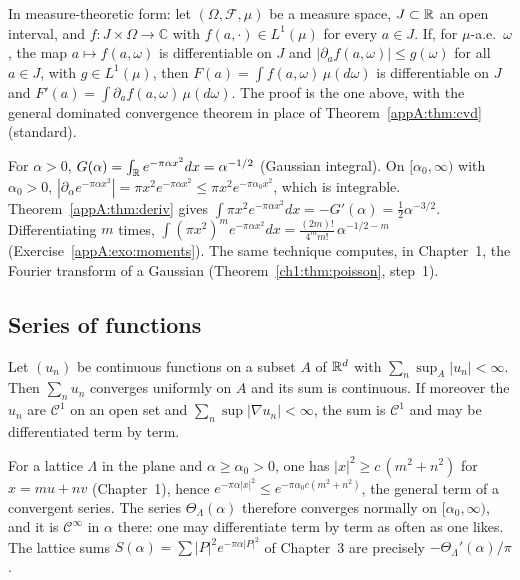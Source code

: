 \begin{uniremark}\tierL{} In measure-theoretic form: let $(\Omega,\mathcal F,\mu)$ be a measure space, $J\subset\mathbb{R}$ an
open interval, and $f:J\times\Omega\to\mathbb C$ with $f(a,\cdot)\in L^1(\mu)$ for every $a\in J$. If, for $\mu$-a.e.\
$\omega$, the map $a\mapsto f(a,\omega)$ is differentiable on $J$ and $|\partial_af(a,\omega)|\le g(\omega)$ for all
$a\in J$, with $g\in L^1(\mu)$, then $F(a)=\int f(a,\omega)\,\mu(d\omega)$ is differentiable on
$J$ and $F'(a)=\int\partial_af(a,\omega)\,\mu(d\omega)$. The proof is the one above, with the general dominated
convergence theorem in place of Theorem~\ref{appA:thm:cvd} (standard).
\end{uniremark}

\begin{example}\label{appA:ex:moments}
For $\alpha>0$, $G(\alpha)=\int_{\mathbb{R}} e^{-\pi\alpha x^2}dx=\alpha^{-1/2}$ (Gaussian integral). On $[\alpha_0,\infty)$ with
$\alpha_0>0$, $|\partial_\alpha e^{-\pi\alpha x^2}|=\pi x^2e^{-\pi\alpha x^2}\le\pi x^2e^{-\pi\alpha_0x^2}$, which is
integrable. Theorem~\ref{appA:thm:deriv} gives $\int\pi x^2e^{-\pi\alpha x^2}dx=-G'(\alpha)=\tfrac12\alpha^{-3/2}$.
Differentiating $m$ times, $\int(\pi x^2)^me^{-\pi\alpha x^2}dx=\frac{(2m)!}{4^mm!}\,\alpha^{-1/2-m}$
(Exercise~\ref{appA:exo:moments}). The same technique computes, in Chapter~1, the Fourier transform of a Gaussian
(Theorem~\ref{ch1:thm:poisson}, step~1).
\end{example}

\subsection{Series of functions}

\begin{proposition}\label{appA:prop:normale}
Let $(u_n)$ be continuous functions on a subset $A$ of $\mathbb{R}^d$ with $\sum_n\sup_A|u_n|<\infty$. Then
$\sum_nu_n$ converges uniformly on $A$ and its sum is continuous. If moreover the $u_n$ are $\mathcal C^1$ on an
open set and $\sum_n\sup|\nabla u_n|<\infty$, the sum is $\mathcal C^1$ and may be differentiated term by term.
\end{proposition}

\begin{example}
For a lattice $\Lambda$ in the plane and $\alpha\ge\alpha_0>0$, one has $|x|^2\ge c\,(m^2+n^2)$ for $x=mu+nv$
(Chapter~1), hence $e^{-\pi\alpha|x|^2}\le e^{-\pi\alpha_0c(m^2+n^2)}$, the general term of a convergent series. The
series $\Theta_\Lambda(\alpha)$ therefore converges normally on $[\alpha_0,\infty)$, and it is $\mathcal C^\infty$ in
$\alpha$ there: one may differentiate term by term as often as one likes. The lattice sums
$S(\alpha)=\sum|P|^2e^{-\pi\alpha|P|^2}$ of Chapter~3 are precisely $-\Theta_\Lambda'(\alpha)/\pi$.
\end{example}

